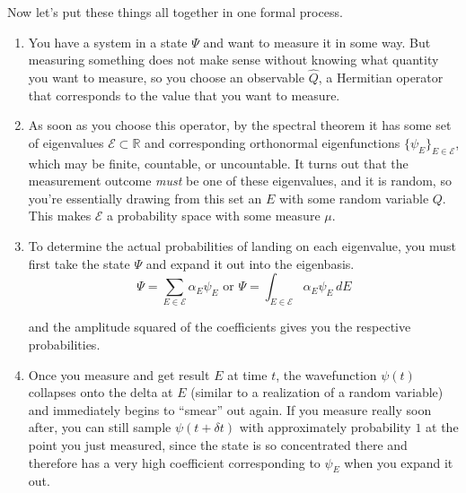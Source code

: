 \documentclass{article}
\theoremstyle{definition}
\begin{document}
    Now let's put these things all together in one formal process. 
    \begin{enumerate} 
      \item You have a system in a state $\Psi$ and want to measure it in some way. But measuring something does not make sense without knowing what quantity you want to measure, so you choose an observable $\hat{Q}$, a Hermitian operator that corresponds to the value that you want to measure. 

      \item As soon as you choose this operator, by the spectral theorem it has some set of eigenvalues $\mathcal{E} \subset \mathbb{R}$ and corresponding orthonormal eigenfunctions $\{\psi_E\}_{E \in \mathcal{E}}$, which may be finite, countable, or uncountable. It turns out that the measurement outcome \textit{must} be one of these eigenvalues, and it is random, so you're essentially drawing from this set an $E$ with some random variable $Q$. This makes $\mathcal{E}$ a probability space with some measure $\mu$.

      \item To determine the actual probabilities of landing on each eigenvalue, you must first take the state $\Psi$ and expand it out into the eigenbasis. 
        \begin{equation} 
          \Psi = \sum_{E \in \mathcal{E}} \alpha_E \psi_E \text{ or } \Psi = \int_{E \in \mathcal{E}} \alpha_E \psi_E \,dE 
        \end{equation}

      and the amplitude squared of the coefficients gives you the respective probabilities. 

      \item Once you measure and get result $E$ at time $t$, the wavefunction  $\psi(t)$ collapses onto the delta at $E$ (similar to a realization of a random variable) and immediately begins to ``smear'' out again. If you measure really soon after, you can still sample $\psi(t + \delta t)$ with approximately probability $1$ at the point you just measured, since the state is so concentrated there and therefore has a very high coefficient corresponding to $\psi_E$ when you expand it out. 
    \end{enumerate}
\end{document}
